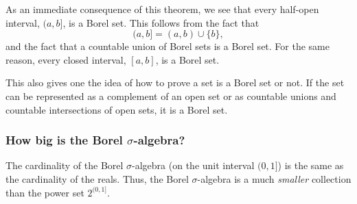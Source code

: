 \begin{corollary}
   As an immediate consequence of this theorem, we see that every half-open interval, $(a, b]$, is a Borel set. This follows from the fact that
   \[
   (a, b] = (a, b) \cup \{b\},
   \]
   and the fact that a countable union of Borel sets is a Borel set. For the same reason, every closed interval, $[a, b]$, is a Borel set.
\end{corollary}

This also gives one the idea of how to prove a set is a Borel set or not. If the set can be represented as a complement of an open set or as countable unions and countable intersections of open sets, it is a Borel set.

\subsubsection{How big is the Borel $\sigma$-algebra?}

\begin{theorem}
   The cardinality of the Borel $\sigma$-algebra (on the unit interval $(0, 1]$) is the same as the cardinality of the reals. Thus, the Borel $\sigma$-algebra is a much \textit{smaller} collection than the power set $2^{(0, 1]}$.
\end{theorem}

